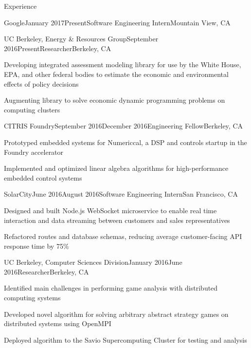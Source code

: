 \documentclass{resume} %
\begin{document}
\begin{rSection}{Experience}
\begin{rSubsection}{Google}{January 2017\textminus Present}{Software Engineering Intern}{Mountain View, CA}
\item[]
\end{rSubsection}
\begin{rSubsection}{UC Berkeley, Energy \& Resources Group}{September 2016\textminus Present}{Researcher}{Berkeley, CA}
\item[] Developing integrated assessment modeling library for use by the White House, EPA, and other federal bodies to estimate the economic and environmental effects of policy decisions 
\item[] Augmenting library to solve economic dynamic programming problems on computing clusters
\end{rSubsection}
\begin{rSubsection}{CITRIS Foundry}{September 2016\textminus December 2016}{Engineering Fellow}{Berkeley, CA}
\item[] Prototyped embedded systems for Numericcal, a DSP and controls startup in the Foundry accelerator
\item[] Implemented and optimized linear algebra algorithms for high-performance embedded control systems
\end{rSubsection}
\begin{rSubsection}{SolarCity}{June 2016\textminus August 2016}{Software Engineering Intern}{San Francisco, CA}
\item[] Designed and built Node.js WebSocket microservice to enable real time interaction and data streaming between customers and sales representatives
\item[] Refactored routes and database schemas, reducing average customer-facing API response time by 75\%
\end{rSubsection}
\begin{rSubsection}{UC Berkeley, Computer Sciences Division}{January 2016\textminus June 2016}{Researcher}{Berkeley, CA}
\item[] Identified main challenges in performing game analysis with distributed computing systems
\item[] Developed novel algorithm for solving arbitrary abstract strategy games on distributed systems using OpenMPI
\item[] Deployed algorithm to the Savio Supercomputing Cluster for testing and analysis
\end{rSubsection}
\end{rSection}
\end{document}

